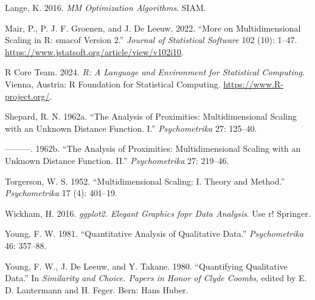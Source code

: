 \documentclass[
  12pt,
  letterpaper,
  DIV=11,
  numbers=noendperiod]{scrartcl}
\newlength{\cslhangindent}
\newenvironment{CSLReferences}[2] %
 {\begin{list}{}{%
  \setlength{\itemindent}{0pt}
  \setlength{\leftmargin}{0pt}
  \setlength{\parsep}{0pt}
  \ifodd #1
   \setlength{\leftmargin}{\cslhangindent}
   \setlength{\itemindent}{-1\cslhangindent}
  \fi
  \setlength{\itemsep}{#2\baselineskip}}}
 {\end{list}}
\theoremstyle{plain}
\theoremstyle{remark}
\begin{document}
\begin{CSLReferences}{1}{0}
Lange, K. 2016. \emph{MM Optimization Algorithms}. SIAM.

Mair, P., P. J. F. Groenen, and J. De Leeuw. 2022. {``{More on
Multidimensional Scaling in R: smacof Version 2}.''} \emph{Journal of
Statistical Software} 102 (10): 1--47.
\url{https://www.jstatsoft.org/article/view/v102i10}.

R Core Team. 2024. \emph{R: A Language and Environment for Statistical
Computing}. {Vienna, Austria}: R Foundation for Statistical Computing.
\url{https://www.R-project.org/}.

Shepard, R. N. 1962a. {``{The Analysis of Proximities: Multidimensional
Scaling with an Unknown Distance Function. I}.''} \emph{Psychometrika}
27: 125--40.

---------. 1962b. {``{The Analysis of Proximities: Multidimensional
Scaling with an Unknown Distance Function. II}.''} \emph{Psychometrika}
27: 219--46.

Torgerson, W. S. 1952. {``{Multidimensional Scaling: I. Theory and
Method}.''} \emph{Psychometrika} 17 (4): 401--19.

Wickham, H. 2016. \emph{{ggplot2. Elegant Graphics fopr Data Analysis}}.
Use r! Springer.

Young, F. W. 1981. {``{Quantitative Analysis of Qualitative Data}.''}
\emph{Psychometrika} 46: 357--88.

Young, F. W., J. De Leeuw, and Y. Takane. 1980. {``Quantifying
Qualitative Data.''} In \emph{Similarity and Choice. Papers in Honor of
Clyde Coombs}, edited by E. D. Lantermann and H. Feger. Bern: Hans
Huber.

\end{CSLReferences}
\end{document}
